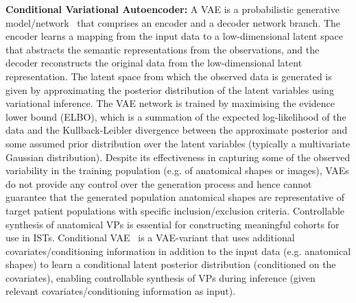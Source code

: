 \documentclass[runningheads]{llncs}
\begin{document}
\textbf{Conditional Variational Autoencoder:} A VAE is a probabilistic generative model/network~\cite{kingma2013auto} that comprises an encoder and a decoder network branch. The encoder learns a mapping from the input data to a low-dimensional latent space that abstracts the semantic representations from the observations, and the decoder reconstructs the original data from the low-dimensional latent representation. The latent space from which the observed data is generated is given by approximating the posterior distribution of the latent variables using variational inference. The VAE network is trained by maximising the evidence lower bound (ELBO), which is a summation of the expected log-likelihood of the data and the Kullback-Leibler divergence between the approximate posterior and some assumed prior distribution over the latent variables (typically a multivariate Gaussian distribution). Despite its effectiveness in capturing some of the observed variability in the training population (e.g. of anatomical shapes or images), VAEs do not provide any control over the generation process and hence cannot guarantee that the generated population anatomical shapes are representative of target patient populations with specific inclusion/exclusion criteria. Controllable synthesis of anatomical VPs is essential for constructing meaningful cohorts for use in ISTs. Conditional VAE~\cite{sohn2015learning} is a VAE-variant that uses additional covariates/conditioning information in addition to the input data (e.g. anatomical shapes) to learn a conditional latent posterior distribution (conditioned on the covariates), enabling controllable synthesis of VPs during inference (given relevant covariates/conditioning information as input).
\end{document}
